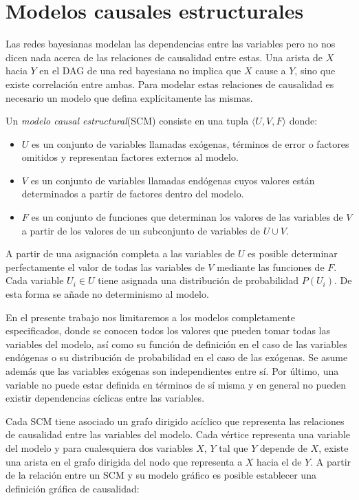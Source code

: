\section{Modelos causales estructurales}
Las redes bayesianas modelan las dependencias entre las variables pero no nos dicen nada acerca de las relaciones de causalidad entre estas. Una arista de $X$ hacia $Y$ en el DAG de una red bayesiana no implica que $X$ cause a $Y$, sino que existe correlación entre ambas. Para modelar estas relaciones de causalidad es necesario un modelo que defina explícitamente las mismas.
\begin{dfn}
	Un \textit{modelo causal estructural}(SCM) consiste en una tupla $\langle U, V, F\rangle$ donde:
	\begin{itemize}
		\item  $U$ es un conjunto de variables llamadas exógenas, términos de error o factores omitidos y representan factores externos al modelo.
		\item $V$ es un conjunto de variables llamadas endógenas cuyos valores están determinados a partir de factores dentro del modelo.
		\item $F$ es un conjunto de funciones que determinan los valores de las variables de $V$ a partir de los valores de un subconjunto de variables de $U \cup V$.
	\end{itemize}
\end{dfn}

A partir de una asignación completa a las variables de $U$ es posible determinar perfectamente el valor de todas las variables de $V$ mediante las funciones de $F$. Cada variable $U_i \in U$ tiene asignada una distribución de probabilidad $P(U_i)$. De esta forma se añade no determinismo al modelo.

En el presente trabajo nos limitaremos a los modelos completamente especificados, donde se conocen todos los valores que pueden tomar todas las variables del modelo, así como su función de definición en el caso de las variables endógenas o su distribución de probabilidad en el caso de las exógenas. Se asume además que las variables exógenas son independientes entre sí. Por último, una variable no puede estar definida en términos de sí misma y en general no pueden existir dependencias cíclicas entre las variables.

Cada SCM tiene asociado un grafo dirigido acíclico que representa las relaciones de causalidad entre las variables del modelo. Cada vértice representa una variable del modelo y para cualesquiera dos variables $X$, $Y$ tal que $Y$ depende de $X$, existe una arista en el grafo dirigida del nodo que representa a $X$ hacia el de $Y$. A partir de la relación entre un SCM y su modelo gráfico es posible establecer una definición gráfica de causalidad:

